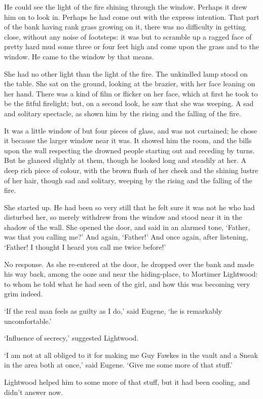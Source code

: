 He could see the light of the fire shining through the window. Perhaps
it drew him on to look in. Perhaps he had come out with the express
intention. That part of the bank having rank grass growing on it, there
was no difficulty in getting close, without any noise of footsteps: it
was but to scramble up a ragged face of pretty hard mud some three or
four feet high and come upon the grass and to the window. He came to the
window by that means.

She had no other light than the light of the fire. The unkindled lamp
stood on the table. She sat on the ground, looking at the brazier, with
her face leaning on her hand. There was a kind of film or flicker on
her face, which at first he took to be the fitful firelight; but, on a
second look, he saw that she was weeping. A sad and solitary spectacle,
as shown him by the rising and the falling of the fire.

It was a little window of but four pieces of glass, and was not
curtained; he chose it because the larger window near it was. It showed
him the room, and the bills upon the wall respecting the drowned people
starting out and receding by turns. But he glanced slightly at them,
though he looked long and steadily at her. A deep rich piece of colour,
with the brown flush of her cheek and the shining lustre of her hair,
though sad and solitary, weeping by the rising and the falling of the
fire.

She started up. He had been so very still that he felt sure it was not
he who had disturbed her, so merely withdrew from the window and stood
near it in the shadow of the wall. She opened the door, and said in an
alarmed tone, ‘Father, was that you calling me?’ And again, ‘Father!’
And once again, after listening, ‘Father! I thought I heard you call me
twice before!’

No response. As she re-entered at the door, he dropped over the bank and
made his way back, among the ooze and near the hiding-place, to Mortimer
Lightwood: to whom he told what he had seen of the girl, and how this
was becoming very grim indeed.

‘If the real man feels as guilty as I do,’ said Eugene, ‘he is
remarkably uncomfortable.’

‘Influence of secrecy,’ suggested Lightwood.

‘I am not at all obliged to it for making me Guy Fawkes in the vault and
a Sneak in the area both at once,’ said Eugene. ‘Give me some more of
that stuff.’

Lightwood helped him to some more of that stuff, but it had been
cooling, and didn’t answer now.

